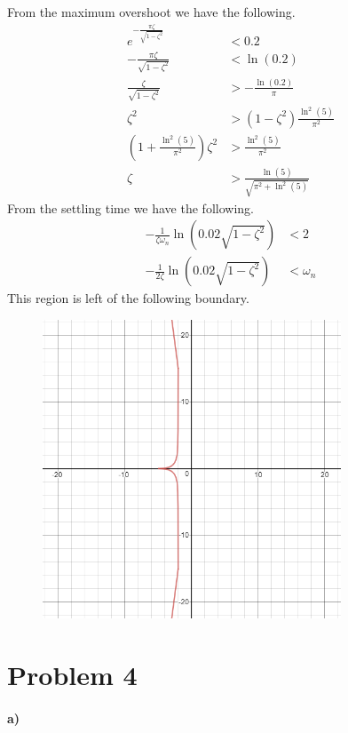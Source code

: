 \documentclass[12pt]{article}
\begin{document}
From the maximum overshoot we have the following.
\begin{align*}
    e^{-\frac{\pi\zeta}{\sqrt{1-\zeta^2}}} &< 0.2\\
    -\frac{\pi\zeta}{\sqrt{1-\zeta^2}} &< \ln(0.2)\\
    \frac{\zeta}{\sqrt{1-\zeta^2}} &> -\frac{\ln(0.2)}{\pi}\\
    \zeta^2 &> (1-\zeta^2)\frac{\ln^2(5)}{\pi^2}\\
    \left(1+\frac{\ln^2(5)}{\pi^2}\right)\zeta^2 &> \frac{\ln^2(5)}{\pi^2}\\
    \zeta &> \frac{\ln(5)}{\sqrt{\pi^2 +\ln^2(5)}}
\end{align*}
From the settling time we have the following.
\begin{align*}
    -\frac{1}{\zeta\omega_n}\ln\left(0.02\sqrt{1-\zeta^2}\right) &< 2\\
    -\frac{1}{2\zeta}\ln\left(0.02\sqrt{1-\zeta^2}\right) &< \omega_n
\end{align*}
This region is left of the following boundary.
\begin{figure}[H]
    \begin{center}
        \includegraphics[width=3.5in]{problem3c.png}
    \end{center}
\end{figure}

\section*{Problem 4}

\paragraph{a)}
\end{document}
